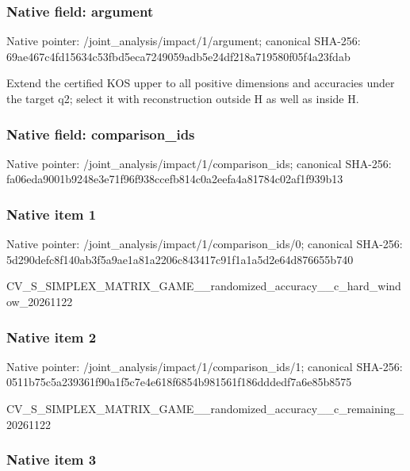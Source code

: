 \documentclass[10pt,a4paper]{article}
\begin{document}
\subsubsection{Native field: argument}


Native pointer: /joint\_analysis/impact/1/argument; canonical SHA-256: 69ae467c4fd15634c53fbd5e\allowbreak{}ca7249059adb5e24df218a71\allowbreak{}9580f05f4a23fdab


Extend the certified KOS upper to all positive dimensions and accuracies under the target q2; select it with reconstruction outside H as well as inside H.


\subsubsection{Native field: comparison\_ids}


Native pointer: /joint\_analysis/impact/1/comparison\_ids; canonical SHA-256: fa06eda9001b9248e3e71f96\allowbreak{}f938ccefb814c0a2eefa4a81\allowbreak{}784c02af1f939b13



\subsubsection{Native item 1}


Native pointer: /joint\_analysis/impact/1\allowbreak{}/comparison\_ids/0; canonical SHA-256: 5d290defc8f140ab3f5a9ae1\allowbreak{}a81a2206c843417c91f1a1a5\allowbreak{}d2e64d876655b740


CV\_S\_SIMPLEX\_MATRIX\_GAME\allowbreak{}\_\_randomized\_accuracy\_\_c\allowbreak{}\_hard\_window\_20261122


\subsubsection{Native item 2}


Native pointer: /joint\_analysis/impact/1\allowbreak{}/comparison\_ids/1; canonical SHA-256: 0511b75c5a239361f90a1f5c\allowbreak{}7e4e618f6854b981561f186d\allowbreak{}ddedf7a6e85b8575


CV\_S\_SIMPLEX\_MATRIX\_GAME\allowbreak{}\_\_randomized\_accuracy\_\_c\allowbreak{}\_remaining\_20261122


\subsubsection{Native item 3}
\end{document}
